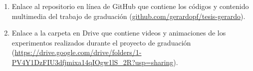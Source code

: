 \begin{enumerate}
	\item Enlace al repositorio en línea de GitHub que contiene los códigos y contenido multimedia del trabajo de graduación (\href{https://github.com/gerardopf/tesis-gerardo}{github.com/gerardopf/tesis-gerardo}). \label{anexo:GitHub}
	\item Enlace a la carpeta en Drive que contiene videos y animaciones de los experimentos realizados durante el proyecto de graduación (\href{https://drive.google.com/drive/folders/1-PV4Y1DzFIU3dfjmixa14qIOgw1lS_2R?usp=sharing}{https://drive.google.com/drive/folders/1-PV4Y1DzFIU3dfjmixa14qIOgw1lS\_2R?usp=sharing}).\label{anexo:multimedia}
\end{enumerate}
